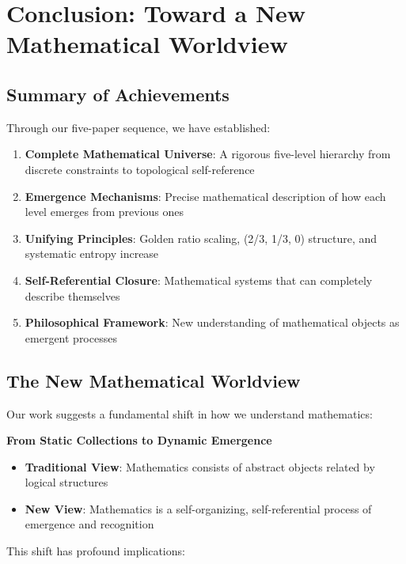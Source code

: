 \documentclass[12pt]{article}
\theoremstyle{plain}
\theoremstyle{definition}
\begin{document}
\section{Conclusion: Toward a New Mathematical Worldview}

\subsection{Summary of Achievements}

Through our five-paper sequence, we have established:

\begin{enumerate}
\item \textbf{Complete Mathematical Universe}: A rigorous five-level hierarchy from discrete constraints to topological self-reference
\item \textbf{Emergence Mechanisms}: Precise mathematical description of how each level emerges from previous ones
\item \textbf{Unifying Principles}: Golden ratio scaling, (2/3, 1/3, 0) structure, and systematic entropy increase
\item \textbf{Self-Referential Closure}: Mathematical systems that can completely describe themselves
\item \textbf{Philosophical Framework}: New understanding of mathematical objects as emergent processes
\end{enumerate}

\subsection{The New Mathematical Worldview}

Our work suggests a fundamental shift in how we understand mathematics:

\begin{center}
\textbf{From Static Collections to Dynamic Emergence}
\end{center}

\begin{itemize}
\item \textbf{Traditional View}: Mathematics consists of abstract objects related by logical structures
\item \textbf{New View}: Mathematics is a self-organizing, self-referential process of emergence and recognition
\end{itemize}

This shift has profound implications:
\end{document}
